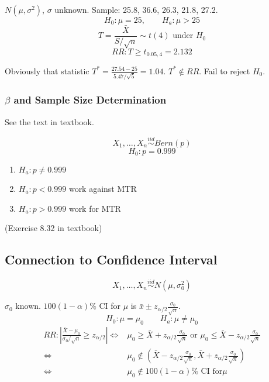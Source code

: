 \begin{exmp}
$N(\mu,\sigma^2)$, $\sigma$ unknown. Sample: 25.8, 36.6, 26.3, 21.8, 27.2.
\[H_0:\mu=25, \qquad H_a:\mu>25 \]
\[T=\frac{\bar{X}}{S/\sqrt{n}} \sim t(4) \text{ under } H_0\]
\[RR:T\geq t_{0.05,4}=2.132\]

Obviously that statistic $T^*=\frac{27.54-25}{5.47/\sqrt{5}}=1.04$. $T^* \notin RR$. Fail to reject $H_0$.
\end{exmp}

\subsubsection{$\beta$ and Sample Size Determination}
See the text in textbook. 
\begin{mdframed}[style=exampledefault,frametitle={Claim: $99.9\%$ of MTR train will be on-time. }]
	\[X_1,\dots,X_n \overset{iid}{\sim} Bern(p)\]
	\[H_0:p=0.999\]
	\begin{enumerate}
	\item $H_a:p\neq0.999$
	\item $H_a:p<0.999$ work against MTR
	\item $H_a:p>0.999$ work for MTR
	\end{enumerate}
\end{mdframed}


\begin{exmp}
(Exercise 8.32 in textbook)
\end{exmp}

\subsection{Connection to Confidence Interval}
\[X_1,\dots,X_n \overset{iid}{\sim} N(\mu,\sigma_0^2)\]

$\sigma_0$ known. $100(1-\alpha)\%$ CI for $\mu$ is $\bar{x} \pm  z_{\alpha/2} \frac{\sigma_0}{\sqrt{n}} $.
\[H_0:\mu=\mu_0 \qquad H_a:\mu\neq\mu_0\]
\begin{align*}
RR:\left| \frac{\bar{X}-\mu_0}{\sigma_0/\sqrt{n}}\geq z_{\alpha/2} \right| \Leftrightarrow & \mu_0\geq \bar{X}+ z_{\alpha/2} \frac{\sigma_0}{\sqrt{n}} \text{ or } \mu_0\leq \bar{X}- z_{\alpha/2} \frac{\sigma_0}{\sqrt{n}} \\
\Leftrightarrow & \mu_0 \notin \left(\bar{X}-  z_{\alpha/2} \frac{\sigma_0}{\sqrt{n}},\bar{X}+ z_{\alpha/2} \frac{\sigma_0}{\sqrt{n}}\right) \\
\Leftrightarrow & \mu_0 \notin 100(1-\alpha)\% \text{ CI for} \mu
\end{align*}

